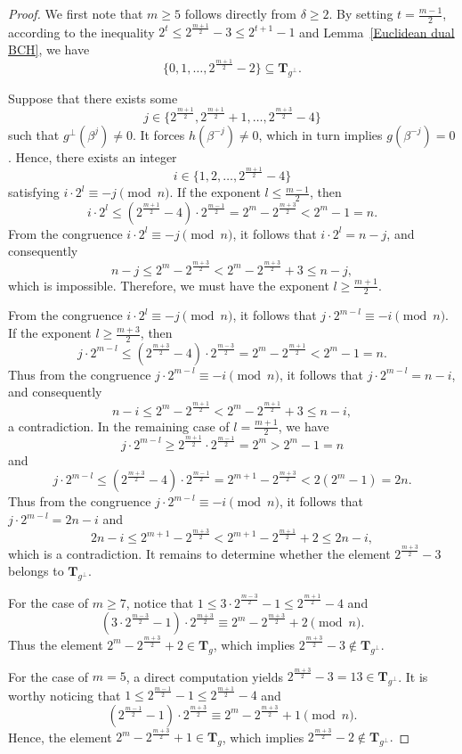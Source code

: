 \documentclass[journal,12pt,onecolumn]{IEEEtran}
\begin{document}
\begin{proof}
We first note that $m \ge 5$ follows directly from $\delta \ge 2$. By setting $t = \frac{m-1}{2}$, according to the inequality
\(
2^t \le 2^{\frac{m+1}{2}} - 3 \le 2^{t+1} - 1
\) and Lemma~\ref{Euclidean dual BCH}, we have
\[
\{0,1,\dots,2^{\frac{m+1}{2}} - 2\} \subseteq \mathbf{T}_{g^\perp}.
\]

Suppose that there exists some
\[
j \in \{2^{\frac{m+1}{2}}, 2^{\frac{m+1}{2}} + 1, \dots, 2^{\frac{m+3}{2}} - 4\}
\]
such that $g^\perp(\beta^j) \ne 0$. It forces $h(\beta^{-j}) \ne 0$, which in turn implies $g(\beta^{-j}) = 0$. Hence, there exists an integer
\[
i \in \{1, 2, \dots, 2^{\frac{m+1}{2}} - 4\}
\]
satisfying
\(
i \cdot 2^l \equiv -j \pmod{n}
\). If the exponent $l \le \frac{m-1}{2}$, then
\[
i \cdot 2^l \le (2^{\frac{m+1}{2}} - 4) \cdot 2^{\frac{m-1}{2}}
= 2^m - 2^{\frac{m+3}{2}}
< 2^m - 1 = n.
\]
From the congruence $i \cdot 2^l \equiv -j \pmod{n}$, it follows that $i \cdot 2^l = n - j$, and consequently
\[
n - j \le 2^m - 2^{\frac{m+3}{2}}
< 2^m - 2^{\frac{m+3}{2}} + 3
\le n - j,
\]
which is impossible. Therefore, we must have the exponent $l \ge \frac{m+1}{2}$.

From the congruence $i \cdot 2^l \equiv -j \pmod{n}$, it follows that
\(
j \cdot 2^{m-l} \equiv -i \pmod{n}
\). If the exponent $l \ge \frac{m+3}{2}$, then
\[
j \cdot 2^{m-l} \le (2^{\frac{m+3}{2}} - 4) \cdot 2^{\frac{m-3}{2}}
= 2^m - 2^{\frac{m+1}{2}}
< 2^m - 1 = n.
\]
Thus from the congruence $j \cdot 2^{m-l} \equiv -i \pmod{n}$, it follows that $j \cdot 2^{m-l} = n - i$, and consequently
\[
n - i \le 2^m - 2^{\frac{m+1}{2}}
< 2^m - 2^{\frac{m+1}{2}} + 3
\le n - i,
\]
a contradiction. In the remaining case of $l=\frac{m+1}{2}$, we have
\[
j \cdot 2^{m-l} \ge 2^{\frac{m+1}{2}} \cdot 2^{\frac{m-1}{2}}
= 2^m > 2^m - 1 = n
\]
and
\[
j \cdot 2^{m-l} \le (2^{\frac{m+3}{2}} - 4) \cdot 2^{\frac{m-1}{2}}
= 2^{m+1} - 2^{\frac{m+3}{2}}
< 2(2^m - 1) = 2n.
\]
Thus from the congruence $j \cdot 2^{m-l} \equiv -i \pmod{n}$, it follows that $j \cdot 2^{m-l} = 2n - i$ and
\[
2n - i \le 2^{m+1} - 2^{\frac{m+3}{2}}
< 2^{m+1} - 2^{\frac{m+1}{2}} + 2
\le 2n - i,
\]
which is a contradiction. It remains to determine whether the element $2^{\frac{m+3}{2}} - 3$ belongs to $\mathbf{T}_{g^\perp}$.

For the case of $m \ge 7$, notice that
\(
1 \le 3 \cdot 2^{\frac{m-3}{2}} - 1 \le 2^{\frac{m+1}{2}} - 4
\)
and
\[
(3 \cdot 2^{\frac{m-3}{2}} - 1) \cdot 2^{\frac{m+3}{2}}
\equiv 2^m - 2^{\frac{m+3}{2}} + 2 \pmod{n}.
\]
Thus the element $2^m - 2^{\frac{m+3}{2}} + 2 \in \mathbf{T}_g$, which implies
\(
2^{\frac{m+3}{2}} - 3 \notin \mathbf{T}_{g^\perp}.
\)

For the case of $m = 5$, a direct computation yields
\(
2^{\frac{m+3}{2}} - 3 = 13 \in \mathbf{T}_{g^\perp}
\). It is worthy noticing that
\(
1 \le 2^{\frac{m-1}{2}} - 1 \le 2^{\frac{m+1}{2}} - 4
\)
and
\[
(2^{\frac{m-1}{2}} - 1) \cdot 2^{\frac{m+3}{2}}
\equiv 2^m - 2^{\frac{m+3}{2}} + 1 \pmod{n}.
\]
Hence, the element $2^m - 2^{\frac{m+3}{2}} + 1 \in \mathbf{T}_g$, which implies
\(
2^{\frac{m+3}{2}} - 2 \notin \mathbf{T}_{g^\perp}.
\)
\end{proof}
\end{document}
